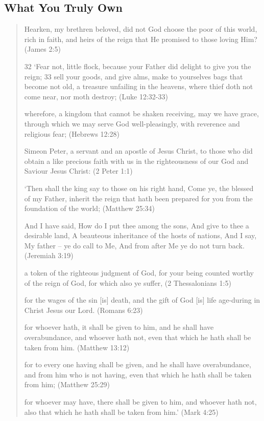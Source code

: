 \documentclass[11pt]{article}
\begin{document}
\subsection{What You Truly Own}\label{what you truly own}
\begin{quote}

Hearken, my brethren beloved, did not God choose the poor of this world, rich in faith, and heirs of the reign that He promised to those loving Him? (James 2:5)

32 `Fear not, little flock, because your Father did delight to give you the reign;
33 sell your goods, and give alms, make to yourselves bags that become not old, a treasure unfailing in the heavens, where thief doth not come near, nor moth destroy; (Luke 12:32-33) 

wherefore, a kingdom that cannot be shaken receiving, may we have grace, through which we may serve God well-pleasingly, with reverence and religious fear; (Hebrews 12:28)

Simeon Peter, a servant and an apostle of Jesus Christ, to those who did obtain a like precious faith with us in the righteousness of our God and Saviour Jesus Christ: (2 Peter 1:1)

`Then shall the king say to those on his right hand, Come ye, the blessed of my Father, inherit the reign that hath been prepared for you from the foundation of the world; (Matthew 25:34)

And I have said, How do I put thee among the sons, And give to thee a desirable land, A beauteous inheritance of the hosts of nations, And I say, My father -- ye do call to Me, And from after Me ye do not turn back. (Jeremiah 3:19)

a token of the righteous judgment of God, for your being counted worthy of the reign of God, for which also ye suffer, (2 Thessalonians 1:5)

for the wages of the sin [is] death, and the gift of God [is] life age-during in Christ Jesus our Lord. (Romans 6:23)

for whoever hath, it shall be given to him, and he shall have overabundance, and whoever hath not, even that which he hath shall be taken from him. (Matthew 13:12)

for to every one having shall be given, and he shall have overabundance, and from him who is not having, even that which he hath shall be taken from him; (Matthew 25:29)

for whoever may have, there shall be given to him, and whoever hath not, also that which he hath shall be taken from him.' (Mark 4:25)


\end{quote}
\end{document}
